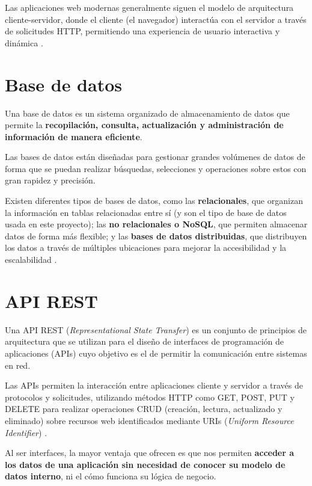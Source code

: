 Las aplicaciones web modernas generalmente siguen el modelo de arquitectura cliente-servidor, donde el cliente (el navegador) interactúa con el servidor a través de solicitudes HTTP, permitiendo una experiencia de usuario interactiva y dinámica \cite{aws:aplicaciones-web}.

\section{Base de datos}

Una base de datos es un sistema organizado de almacenamiento de datos que permite la \textbf{recopilación, consulta, actualización y administración de información de manera eficiente}.

Las bases de datos están diseñadas para gestionar grandes volúmenes de datos de forma que se puedan realizar búsquedas, selecciones y operaciones sobre estos con gran rapidez y precisión.

Existen diferentes tipos de bases de datos, como las \textbf{relacionales}, que organizan la información en tablas relacionadas entre sí (y son el tipo de base de datos usada en este proyecto); las \textbf{no relacionales o NoSQL}, que permiten almacenar datos de forma más flexible; y las \textbf{bases de datos distribuidas}, que distribuyen los datos a través de múltiples ubicaciones para mejorar la accesibilidad y la escalabilidad \cite{wikipedia:db}.

\section{API REST}

Una API REST (\textit{Representational State Transfer}) es un conjunto de principios de arquitectura que se utilizan para el diseño de interfaces de programación de aplicaciones (APIs) cuyo objetivo es el de permitir la comunicación entre sistemas en red.

 Las APIs permiten la interacción entre aplicaciones cliente y servidor a través de protocolos y solicitudes, utilizando métodos HTTP como GET, POST, PUT y DELETE para realizar operaciones CRUD (creación, lectura, actualizado y eliminado) sobre recursos web identificados mediante URIs (\textit{Uniform Resource Identifier}) \cite{red-hat:api-rest}.
 
 Al ser interfaces, la mayor ventaja que ofrecen es que nos permiten \textbf{acceder a los datos de una aplicación sin necesidad de conocer su modelo de datos interno}, ni el cómo funciona su lógica de negocio.

